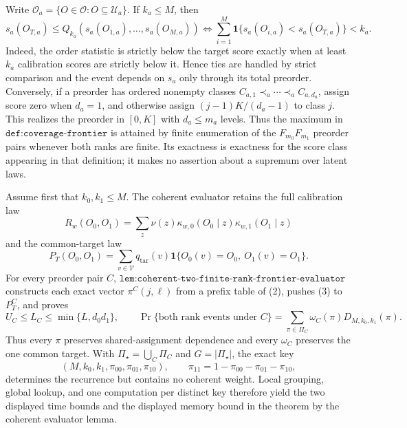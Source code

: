 Write \(\mathcal O_a=\{O\in\mathcal O:O\subseteq\mathcal U_a\}\). If \(k_a\le M\), then
\[
s_a(O_{T,a})\le Q_{k_a}(s_a(O_{1,a}),\ldots,s_a(O_{M,a}))
\Longleftrightarrow
\sum_{i=1}^M\mathbf 1\{s_a(O_{i,a})<s_a(O_{T,a})\}<k_a.
\tag{1}
\]
Indeed, the order statistic is strictly below the target score exactly when at least \(k_a\) calibration scores are strictly below it. Hence ties are handled by strict comparison and the event depends on \(s_a\) only through its total preorder. Conversely, if a preorder has ordered nonempty classes \(C_{a,1}\prec_a\cdots\prec_a C_{a,d_a}\), assign score zero when \(d_a=1\), and otherwise assign \((j-1)K/(d_a-1)\) to class \(j\). This realizes the preorder in \([0,K]\) with \(d_a\le m_a\) levels. Thus the maximum in \(\texttt{def:coverage-frontier}\) is attained by finite enumeration of the \(F_{m_0}F_{m_1}\) preorder pairs whenever both ranks are finite. Its exactness is exactness for the score class appearing in that definition; it makes no assertion about a supremum over latent laws.

Assume first that \(k_0,k_1\le M\). The coherent evaluator retains the full calibration law
\[
R_w(O_0,O_1)=\sum_z\nu(z)\kappa_{w,0}(O_0\mid z)\kappa_{w,1}(O_1\mid z)
\tag{2}
\]
and the common-target law
\[
P_T(O_0,O_1)=\sum_{v\in\mathcal V}q_{\mathrm{tar}}(v)\mathbf 1\{O_0(v)=O_0,\ O_1(v)=O_1\}.
\tag{3}
\]
For every preorder pair \(C\), \(\texttt{lem:coherent-two-finite-rank-frontier-evaluator}\) constructs each exact vector \(\pi^C(j,\ell)\) from a prefix table of (2), pushes (3) to \(P_T^C\), and proves
\[
U_C\le L_C\le\min\{L,d_0d_1\},\qquad
\Pr\{\text{both rank events under }C\}=\sum_{\pi\in\Pi_C}\omega_C(\pi)D_{M,k_0,k_1}(\pi).
\tag{4}
\]
Thus every \(\pi\) preserves shared-assignment dependence and every \(\omega_C\) preserves the one common target. With \(\Pi_\star=\bigcup_C\Pi_C\) and \(G=|\Pi_\star|\), the exact key
\[
(M,k_0,k_1,\pi_{00},\pi_{01},\pi_{10}),\qquad \pi_{11}=1-\pi_{00}-\pi_{01}-\pi_{10},
\tag{5}
\]
determines the recurrence but contains no coherent weight. Local grouping, global lookup, and one computation per distinct key therefore yield the two displayed time bounds and the displayed memory bound in the theorem by the coherent evaluator lemma.

